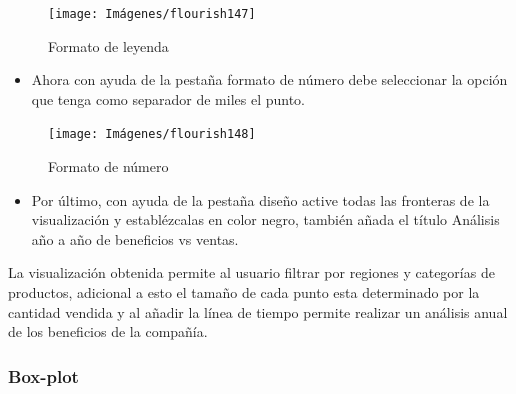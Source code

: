 \documentclass[
]{book}
\providecommand{\tightlist}{%
  \setlength{\itemsep}{0pt}\setlength{\parskip}{0pt}}
\begin{document}
\begin{figure}

{\centering \texttt{[image: Imágenes/flourish147]} 

}

\caption{Formato de leyenda}\label{fig:formatoleyendadispersionflourish-fig}
\end{figure}

\begin{itemize}
\tightlist
\item
  Ahora con ayuda de la pestaña formato de número debe seleccionar la opción que tenga como separador de miles el punto.
\end{itemize}

\begin{figure}

{\centering \texttt{[image: Imágenes/flourish148]} 

}

\caption{Formato de número}\label{fig:formatonumerodispersionflourish-fig}
\end{figure}

\begin{itemize}
\tightlist
\item
  Por último, con ayuda de la pestaña diseño active todas las fronteras de la visualización y establézcalas en color negro, también añada el título Análisis año a año de beneficios vs ventas.
\end{itemize}

La visualización obtenida permite al usuario filtrar por regiones y categorías de productos, adicional a esto el tamaño de cada punto esta determinado por la cantidad vendida y al añadir la línea de tiempo permite realizar un análisis anual de los beneficios de la compañía.

\hypertarget{boxplotflourish}{%
\subsubsection{Box-plot}\label{boxplotflourish}}
\end{document}
